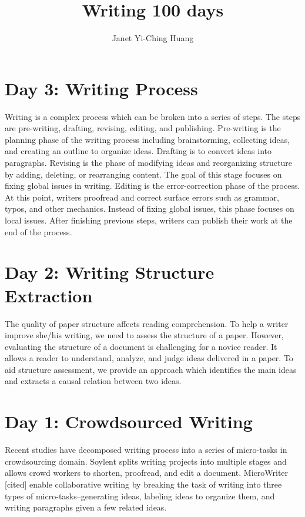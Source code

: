 \documentclass[a4paper]{article}
\title{\textbf{Writing 100 days}}
\author{Janet Yi-Ching Huang}
\begin{document}
\maketitle
\section{Day 3: Writing Process}
Writing is a complex process which can be broken into a series of steps. The steps are pre-writing, drafting, revising, editing, and publishing. Pre-writing is the planning phase of the writing process including brainstorming, collecting ideas, and creating an outline to organize ideas. Drafting is to convert ideas into paragraphs. Revising is the phase of modifying ideas and reorganizing structure by adding, deleting, or rearranging content. The goal of this stage focuses on fixing global issues in writing. Editing is the error-correction phase of the process. At this point, writers proofread and correct surface errors such as grammar, typos, and other mechanics. Instead of fixing global issues, this phase focuses on local issues. After finishing previous steps, writers can publish their work at the end of the process.

\section{Day 2: Writing Structure Extraction}
The quality of paper structure affects reading comprehension. To help a writer improve she/his writing, we need to assess the structure of a paper. However, evaluating the structure of a document is challenging for a novice reader. It allows a reader to understand, analyze, and judge ideas delivered in a paper. To aid structure assessment, we provide an approach which identifies the main ideas and extracts a causal relation between two ideas.

\section{Day 1: Crowdsourced Writing}
Recent studies have decomposed writing process into a series of micro-tasks in crowdsourcing domain. Soylent \cite{Bernstein:UIST10} splits writing projects into multiple stages and allows crowd workers to shorten, proofread, and edit a document. MicroWriter [cited] enable collaborative writing by breaking the task of writing into three types of micro-tasks--generating ideas, labeling ideas to organize them, and writing paragraphs given a few related ideas.

 

\end{document}
